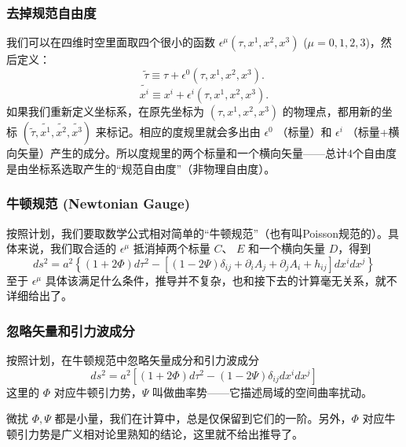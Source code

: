 \documentclass[CJK,13pt]{beamer}
\begin{document}
  
  \begin{frame}
    \frametitle{去掉规范自由度}
    我们可以在四维时空里面取四个很小的函数 $\epsilon^\mu(\tau, x^1, x^2, x^3)$ ($\mu=0,1,2,3$)，然后定义：
    $$\tilde{\tau} \equiv \tau + \epsilon^0(\tau, x^1, x^2, x^3).$$
    $$\tilde{x^i} \equiv x^i + \epsilon^i(\tau, x^1, x^2, x^3).$$
    如果我们重新定义坐标系，在原先坐标为 $(\tau, x^1, x^2, x^3)$ 的物理点，都用新的坐标 $(\tilde{\tau}, \tilde{x^1}, \tilde{x^2}, \tilde{x^3})$ 来标记。相应的度规里就会多出由 $\epsilon^0$ （标量）和 $\epsilon^i$ （标量+横向矢量）产生的成分。所以度规里的两个标量和一个横向矢量——总计4个自由度是由坐标系选取产生的“规范自由度”（非物理自由度）。


  \end{frame}


  \begin{frame}
    \frametitle{牛顿规范 (Newtonian Gauge)}
    按照计划，我们要取数学公式相对简单的“牛顿规范”（也有叫Poisson规范的）。具体来说，我们取合适的 $\epsilon^\mu$ 抵消掉两个标量 $C$、 $E$ 和一个横向矢量  $D$，得到
    {\small  $$ ds^2 = a^2\left\{\left(1+2\Phi\right)d\tau^2 - \left[\left(1-2\Psi\right)\delta_{ij}+ \partial_iA_j+\partial_jA_i + h_{ij}\right]dx^idx^j\right\}$$}
    至于  $\epsilon^\mu$ 具体该满足什么条件，推导并不复杂，也和接下去的计算毫无关系，就不详细给出了。

    \skipline
    
    
  \end{frame}


  \begin{frame}
    \frametitle{忽略矢量和引力波成分}
    按照计划，在牛顿规范中忽略矢量成分和引力波成分
      {\blue $$ ds^2 = a^2\left[\left(1+2\Phi\right)d\tau^2 - \left(1-2\Psi\right)\delta_{ij}dx^idx^j\right]$$}
      这里的 $\Phi$ 对应牛顿引力势，$\Psi$ 叫做曲率势——它描述局域的空间曲率扰动。

      \skipline

      {\blue 微扰 $\Phi,\Psi$ 都是小量，我们在计算中，总是仅保留到它们的一阶。}另外，$\Phi$ 对应牛顿引力势是广义相对论里熟知的结论，这里就不给出推导了。

      \skipline
      
  \end{frame}
\end{document}
